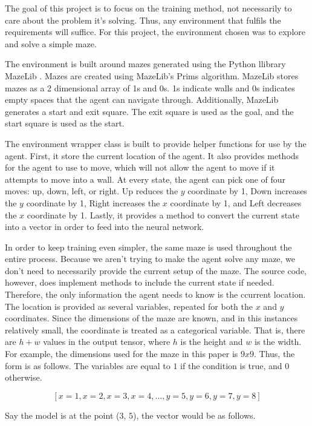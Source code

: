 \documentclass[12pt,letterpaper]{article}
\begin{document}
The goal of this project is to focus on the training method, not necessarily to care about the problem it's solving.
Thus, any environment that fulfils the requirements will suffice.
For this project, the environment chosen was to explore and solve a simple maze.

The environment is built around mazes generated using the Python \cite{lang_python} llibrary MazeLib \cite{lib_mazelib}.
Mazes are created using MazeLib's Prims algorithm.
MazeLib stores mazes as a 2 dimensional array of 1s and 0s.
1s indicate walls and 0s indicates empty spaces that the agent can navigate through.
Additionally, MazeLib generates a start and exit square.
The exit square is used as the goal, and the start square is used as the start.

The environment wrapper class is built to provide helper functions for use by the agent.
First, it store the current location of the agent.
It also provides methods for the agent to use to move, which will not allow the agent to move if it attempts to move into a wall.
At every state, the agent can pick one of four moves: up, down, left, or right.
Up reduces the $y$ coordinate by 1, Down increases the $y$ coordinate by 1, Right increases the $x$ coordinate by 1, and Left decreases the $x$ coordinate by 1.
Lastly, it provides a method to convert the current state into a vector in order to feed into the neural network.

In order to keep training even simpler, the same maze is used throughout the entire process.
Because we aren't trying to make the agent solve any maze, we don't need to necessarily provide the current setup of the maze.
The source code, however, does implement methods to include the current state if needed.
Therefore, the only information the agent needs to know is the ccurrent location.
The location is provided as several variables, repeated for both the $x$ and $y$ coordinates.
Since the dimensions of the maze are known, and in this instances relatively small, the coordinate is treated as a categorical variable.
That is, there are $h + w$ values in the output tensor, where $h$ is the height and $w$ is the width.
For example, the dimensions used for the maze in this paper is $9x9$.
Thus, the form is as follows. The variables are equal to $1$ if the condition is true, and $0$ otherwise.

$$\left [ x = 1 , x = 2 , x = 3 , x = 4 , \hdots , y = 5 , y = 6 , y = 7 , y = 8 \right]$$

Say the model is at the point ($3$, $5$), the vector would be as follows.
\end{document}
